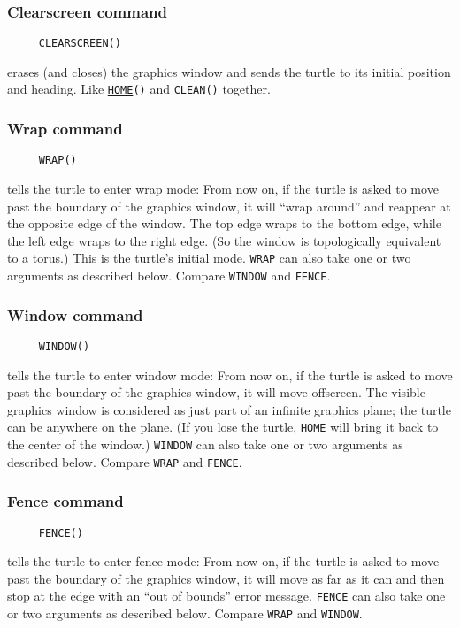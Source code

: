 \subsubsection*{Clearscreen command}
\begin{verbatim}
     CLEARSCREEN()
\end{verbatim}
erases (and closes) the graphics window and sends the turtle to its
initial position and heading.  Like
\texttt{\hyperref[logoturtle:home]{HOME}()} and \texttt{CLEAN()}
together.

\subsubsection*{Wrap command}
\begin{verbatim}
     WRAP()
\end{verbatim}
tells the turtle to enter wrap mode: From now on, if the turtle is
asked to move past the boundary of the graphics window, it will ``wrap
around'' and reappear at the opposite edge of the window.  The top
edge wraps to the bottom edge, while the left edge wraps to the right
edge.  (So the window is topologically equivalent to a torus.)  This
is the turtle's initial mode.  \texttt{WRAP} can also take one or two
arguments as described below.  Compare \texttt{WINDOW} and
\texttt{FENCE}.

\subsubsection*{Window command}
\begin{verbatim}
     WINDOW()
\end{verbatim}
tells the turtle to enter window mode: From now on, if the turtle is
asked to move past the boundary of the graphics window, it will move
offscreen.  The visible graphics window is considered as just part of
an infinite graphics plane; the turtle can be anywhere on the plane.
(If you lose the turtle, \texttt{HOME} will bring it back to the
center of the window.)  \texttt{WINDOW} can also take one or two
arguments as described below.  Compare \texttt{WRAP} and
\texttt{FENCE}.

\subsubsection*{Fence command}
\begin{verbatim}
     FENCE()
\end{verbatim}
tells the turtle to enter fence mode: From now on, if the turtle is
asked to move past the boundary of the graphics window, it will move
as far as it can and then stop at the edge with an ``out of bounds''
error message.  \texttt{FENCE} can also take one or two arguments as
described below.  Compare \texttt{WRAP} and \texttt{WINDOW}.

